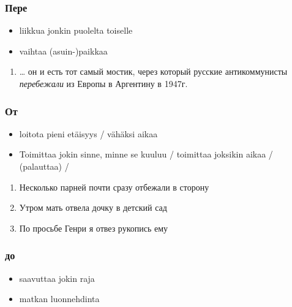 \documentclass[]{scrartcl}
\providecommand{\tightlist}{%
  \setlength{\itemsep}{0pt}\setlength{\parskip}{0pt}}
\begin{document}
\subsubsection{Пере}\label{ux43fux435ux440ux435}

\begin{itemize}
\tightlist
\item
  liikkua jonkin puolelta toiselle
\item
  vaihtaa (asuin-)paikkaa
\end{itemize}

\begin{enumerate}
\def\labelenumi{(\arabic{enumi})}
\setcounter{enumi}{433}
\tightlist
\item
  \ldots{} он и есть тот самый мостик, через который русские
  антикоммунисты \emph{перебежали} из Европы в Аргентину в 1947г.
\end{enumerate}

\subsubsection{От}\label{ux43eux442}

\begin{itemize}
\tightlist
\item
  loitota pieni etäisyys / vähäksi aikaa
\item
  Toimittaa jokin sinne, minne se kuuluu / toimittaa joksikin aikaa /
  (palauttaa) /
\end{itemize}

\begin{enumerate}
\def\labelenumi{(\arabic{enumi})}
\setcounter{enumi}{434}
\tightlist
\item
  Несколько парней почти сразу отбежали в сторону
\item
  Утром мать отвела дочку в детский сад
\item
  По просьбе Генри я отвез рукопись ему
\end{enumerate}

\subsubsection{до}\label{ux434ux43e}

\begin{itemize}
\tightlist
\item
  saavuttaa jokin raja
\item
  matkan luonnehdinta
\end{itemize}
\end{document}
